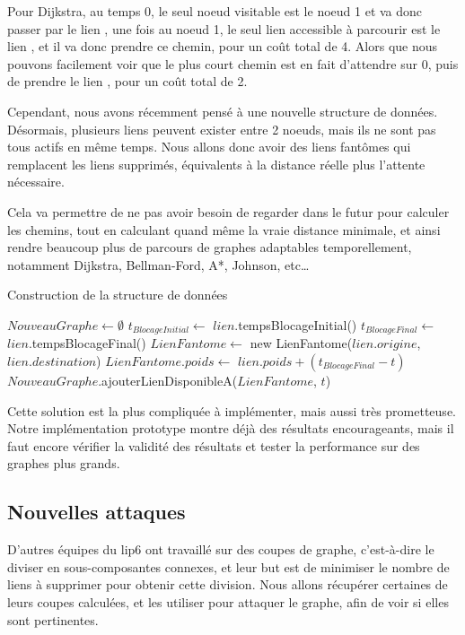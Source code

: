 Pour Dijkstra, au temps 0, le seul noeud visitable est le noeud 1 et va donc passer par le lien , une fois au noeud 1, le seul lien accessible à parcourir est le lien , et il va donc prendre ce chemin, pour un coût total de 4.
Alors que nous pouvons facilement voir que le plus court chemin est en fait d'attendre sur 0, puis de prendre le lien , pour un coût total de 2.

Cependant, nous avons récemment pensé à une nouvelle structure de données.
Désormais, plusieurs liens peuvent exister entre 2 noeuds, mais ils ne sont pas tous actifs en même temps.
Nous allons donc avoir des liens fantômes qui remplacent les liens supprimés, équivalents à la distance réelle plus l'attente nécessaire.

Cela va permettre de ne pas avoir besoin de regarder dans le futur pour calculer les chemins, tout en calculant quand même la vraie distance minimale,
et ainsi rendre beaucoup plus de parcours de graphes adaptables temporellement, notamment Dijkstra, Bellman-Ford, A*, Johnson, etc\dots

\begin{algorithm}[H]
\caption{Construction de la structure de données}
\begin{algorithmic}
\State $NouveauGraphe \gets \emptyset$
    \State $t_{BlocageInitial} \gets$ $lien$.tempsBlocageInitial()
    \State $t_{BlocageFinal} \gets$ $lien$.tempsBlocageFinal()
        \State $LienFantome \gets$ new LienFantome($lien.origine$, $lien.destination$)
        \State $LienFantome.poids \gets$ $lien.poids + (t_{BlocageFinal} - t)$
        \State $NouveauGraphe$.ajouterLienDisponibleA($LienFantome$, $t$)
    \EndFor
\EndFor
\end{algorithmic}
\end{algorithm}

Cette solution est la plus compliquée à implémenter, mais aussi très prometteuse.
Notre implémentation prototype montre déjà des résultats encourageants, mais il faut encore vérifier la validité des résultats et tester la performance sur des graphes plus grands.

\subsection{Nouvelles attaques}\label{subsec:nouvelles_attaques}
D'autres équipes du lip6 ont travaillé sur des coupes de graphe, c'est-à-dire le diviser en sous-composantes connexes, et leur but est de minimiser le nombre de liens à supprimer pour obtenir cette division.
Nous allons récupérer certaines de leurs coupes calculées, et les utiliser pour attaquer le graphe, afin de voir si elles sont pertinentes.

